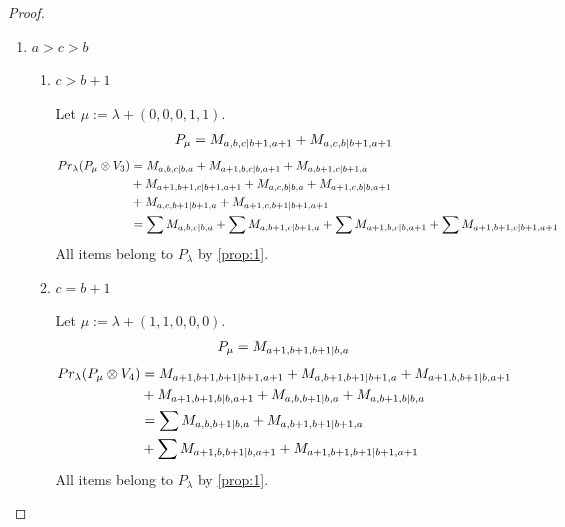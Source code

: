 \begin{proof}
\begin{enumerate}
    \item $a>c>b$
      \begin{enumerate}
        \item $c>b+1$ \par
        Let $\mu:=\lambda + (0,0,0,1,1) $.
        \begin{equation}\notag
          \begin{aligned}
            P_\mu = M_{a,b,c|b+1,a+1}
+ M_{a,c,b|b+1,a+1}
          \end{aligned}
        \end{equation}
        \begin{equation}\notag
          \begin{aligned}
            Pr_{\lambda}(P_\mu \otimes V_{3}) &=
M_{a,b,c|b,a}
+ M_{a+1,b,c|b,a+1}
+ M_{a,b+1,c|b+1,a}\\
                                              &
+ M_{a+1,b+1,c|b+1,a+1}
+ M_{a,c,b|b,a}
+ M_{a+1,c,b|b,a+1}\\
                                              &
+ M_{a,c,b+1|b+1,a}
+ M_{a+1,c,b+1|b+1,a+1} \\
                                               &=
\sum M_{a,b,c|b,a}
+ \sum M_{a,b+1,c|b+1,a}
+ \sum M_{a+1,b,c|b,a+1}
+ \sum M_{a+1,b+1,c|b+1,a+1}
          \end{aligned}
        \end{equation}
All items belong to $P_\lambda$ by \cref{prop:1}.

        \item $c=b+1$ \par
        Let $\mu:=\lambda + (1,1,0,0,0) $.
        \begin{equation}\notag
          \begin{aligned}
            P_\mu = M_{a+1,b+1,b+1|b,a}
          \end{aligned}
        \end{equation}
        \begin{equation}\notag
          \begin{aligned}
            Pr_{\lambda}(P_\mu \otimes V_{4}) &=
M_{a+1,b+1,b+1|b+1,a+1}
+ M_{a,b+1,b+1|b+1,a}
+ M_{a+1,b,b+1|b,a+1}\\
                                              &
+ M_{a+1,b+1,b|b,a+1}
+ M_{a,b,b+1|b,a}
+ M_{a,b+1,b|b,a} \\
                                               &=
\sum M_{a,b,b+1|b,a}
+  M_{a,b+1,b+1|b+1,a}\\
                                              &
+ \sum M_{a+1,b,b+1|b,a+1}
+  M_{a+1,b+1,b+1|b+1,a+1}
          \end{aligned}
        \end{equation}
All items belong to $P_\lambda$ by \cref{prop:1}.


\end{enumerate}
\end{enumerate}
\end{proof}
